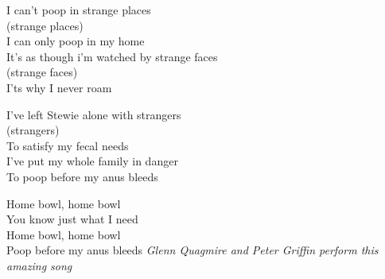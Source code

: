 \vspace{10pt}
\par
I can't poop in strange places\\
(strange places)\\
I can only poop in my home\\
It's as though i'm watched by strange faces\\
(strange faces)\\
I'ts why I never roam\par
\vspace{10pt}
I've left Stewie alone with strangers\\
(strangers)\\
To satisfy my fecal needs\\
I've put my whole family in danger\\
To poop before my anus bleeds\par
\vspace{10pt}
Home bowl, home bowl\\
You know just what I need\\
Home bowl, home bowl\\
Poop before my anus bleeds
\vspace{10pt}
{\footnotesize\textit{Glenn Quagmire and Peter Griffin perform this amazing song}}
